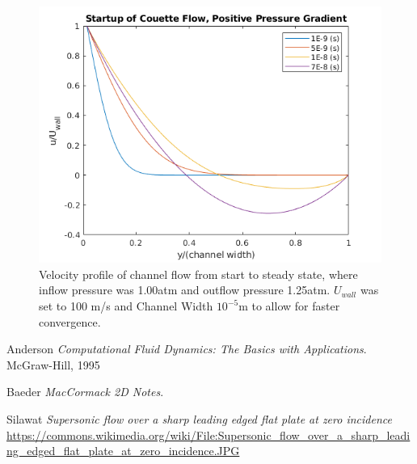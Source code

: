 \documentclass[10pt,a4paper]{article}
\begin{document}
\begin{figure}[!htb]
	\begin{center}
		\includegraphics[scale=0.7]{images/FlowStartup_IncreasingPressure.png} 
		\caption{Velocity profile of channel flow from start to steady state, where inflow pressure was 1.00atm and outflow pressure 1.25atm. $U_{wall}$ was set to 100 m/s and Channel Width $10^{-5}$m to allow for faster convergence.}
		\label{fig:Couette_increasingPres}
	\end{center}
\end{figure}






\FloatBarrier


\renewcommand\refname{REFERENCES}

\begin{thebibliography}{9}
	Anderson
	\textit{Computational Fluid Dynamics: The Basics with Applications}. 
	McGraw-Hill, 1995
	
	Baeder
	\textit{MacCormack 2D Notes}.
	
	Silawat
	\textit{Supersonic flow over a sharp leading edged flat plate at zero incidence}
	\url{https://commons.wikimedia.org/wiki/File:Supersonic_flow_over_a_sharp_leading_edged_flat_plate_at_zero_incidence.JPG}

	
	
\end{thebibliography}
\end{document}
